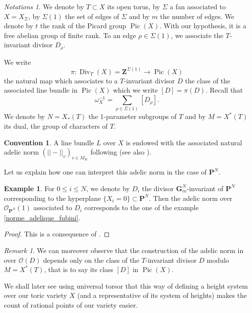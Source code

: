 \documentclass{proc-l}
\newcommand{\Z}{\mathbf{Z}}
\newcommand{\Proj}{\mathbf{P}}
\newcommand{\G}{\mathbf{G}}
\DeclareMathOperator{\Pic}{Pic}
\DeclareMathOperator{\Div}{Div}
\newcommand{\sheafO}{\mathcal{O}}
\newcommand{\w}{\omega}
\theoremstyle{definition}
\newtheorem{convention}[theorem]{Convention}
\newtheorem{example}[theorem]{Example}
\theoremstyle{remark}
\newtheorem{remark}[theorem]{Remark}
\newtheorem*{Notations}{Notations}
\numberwithin{equation}{section}
\begin{document}
\begin{Notations}\label{notations_varietes_toriques}
We denote by $T \subset X$ its open torus, by $\Sigma$ a fan associated to $X = X_{\Sigma}$, by $\Sigma(1)$ the set of edges of $\Sigma$ and by $m$ the number of edges. We denote by $t$ the rank of the Picard group $\Pic(X)$. With our hypothesis, it is a free abelian group of finite rank. To an edge $\rho \in \Sigma(1)$, we associate the $T$-invariant divisor $D_{\rho}$.

We write $$\pi : \Div_T(X) = \Z^{\Sigma(1)} \rightarrow \Pic(X)$$ the natural map which associates to a $T$-invariant divisor $D$ the class of the associated line bundle in $\Pic(X)$ which we write $[D] = \pi(D)$. Recall that $$\w_{X}^{-1} = \sum\limits_{\rho \in \Sigma(1)} [D_{\rho}] .$$We denote by $N = X_*(T)$ the 1-parameter subgroups of $T$ and by $M = X^*(T)$ its dual, the group of characters of $T$.


\end{Notations}


\begin{convention}\label{convention_adelic_norm_toric_variety}
    A line bundle $L$ over $X$ is endowed with the associated natural adelic norm $(||-||_v)_{v \in M_K}$ following \cite[definition 9.2]{salberger_torsor} (see also \cite[proposition 2.1.2]{Batyrev1990}).
\end{convention}

Let us explain how one can interpret this adelic norm in the case of $\Proj^N$.


\begin{example}
    For $0 \leq i \leq N$, we denote by $D_{i}$ the divisor $\G_m^{N}$-invariant of $\Proj^N$ corresponding to the hyperplane $\{ X_i = 0 \} \subset \Proj^N$. Then the adelic norm over $\sheafO_{\Proj^N}(1)$ associated to $D_i$ corresponds to the one of the example \ref{norme_adelique_fubini}.
\end{example}

\begin{proof}
    This is a consequence of \cite[proposition 9.8]{salberger_torsor}.
\end{proof}

\begin{remark}
We can moreover observe that the construction of the adelic norm in \cite[definition 9.2]{salberger_torsor} over $\sheafO(D)$ depends only on the class of the $T$-invariant divisor $D$ modulo $M = X^*(T)$, that is to say its class $[D]$ in $\Pic(X)$.
\end{remark}We shall later see using universal torsor that this way of defining a height system over our toric variety $X$ (and a representative of its system of heights) makes the count of rational points of our variety easier.
\end{document}
